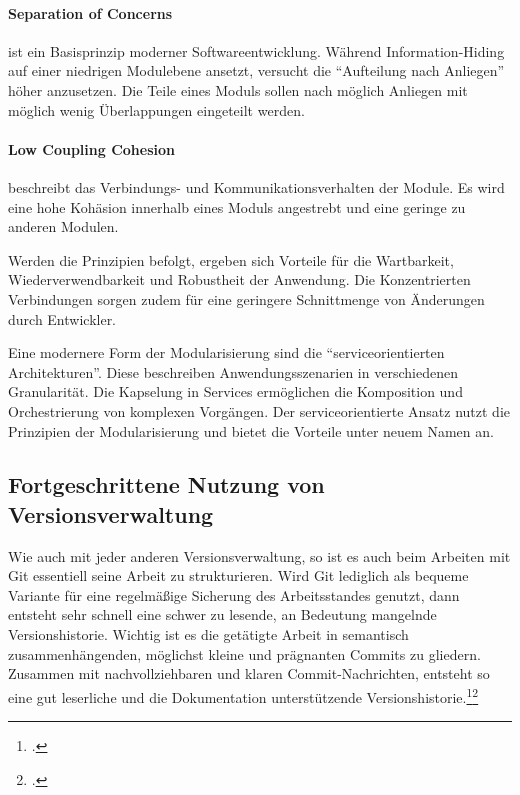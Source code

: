 \paragraph{Separation of Concerns} ist ein Basisprinzip moderner Softwareentwicklung. Während Information-Hiding auf einer niedrigen Modulebene ansetzt, versucht die ``Aufteilung nach Anliegen'' höher anzusetzen. Die Teile eines Moduls sollen nach möglich Anliegen  mit möglich wenig Überlappungen eingeteilt werden. 
\paragraph{Low Coupling Cohesion} beschreibt das Verbindungs- und Kommunikationsverhalten der Module. Es wird eine hohe Kohäsion innerhalb eines Moduls angestrebt und eine geringe zu anderen Modulen.

Werden die Prinzipien befolgt, ergeben sich Vorteile für die Wartbarkeit, Wiederverwendbarkeit und Robustheit der Anwendung. Die Konzentrierten Verbindungen sorgen zudem für eine geringere Schnittmenge von Änderungen durch Entwickler.

Eine modernere Form der Modularisierung sind die ``serviceorientierten Architekturen''. Diese beschreiben Anwendungsszenarien in verschiedenen Granularität. Die Kapselung in Services ermöglichen die Komposition und Orchestrierung von komplexen Vorgängen. Der serviceorientierte Ansatz nutzt die Prinzipien der Modularisierung und bietet die Vorteile unter neuem Namen an.

\subsection{Fortgeschrittene Nutzung von Versionsverwaltung}



Wie auch mit jeder anderen Versionsverwaltung, so ist es auch beim Arbeiten mit Git essentiell seine Arbeit zu strukturieren. Wird Git lediglich als bequeme Variante für eine regelmäßige Sicherung des Arbeitsstandes genutzt, dann entsteht sehr schnell eine schwer zu lesende, an Bedeutung mangelnde Versionshistorie. Wichtig ist es die getätigte Arbeit in semantisch zusammenhängenden, möglichst kleine und prägnanten Commits zu gliedern.
Zusammen mit nachvollziehbaren und klaren Commit-Nachrichten, entsteht so eine gut leserliche und die Dokumentation unterstützende Versionshistorie.\footcite[Making only one change per commit][]{git-essentials-2017}\footcite[Writing commit messages before starting to code][]{git-essentials-2017}

